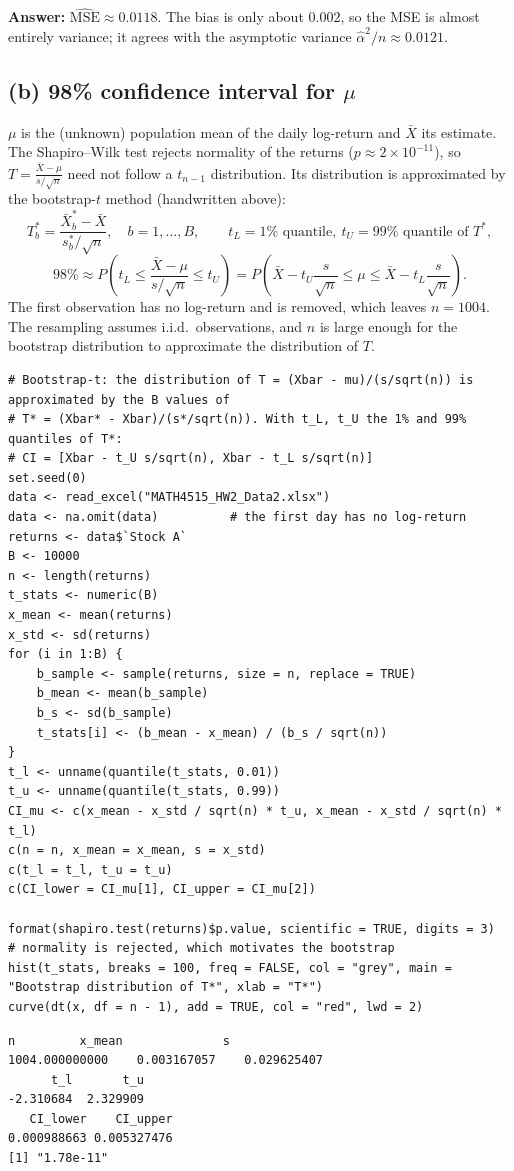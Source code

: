 \documentclass[11pt,a4paper]{article}
\begin{document}
\noindent\textbf{Answer:} $\widehat{\text{MSE}} \approx 0.0118$. The bias is only about $0.002$, so the MSE is
almost entirely variance; it agrees with the asymptotic variance $\hat\alpha^2/n \approx 0.0121$.

\subsection*{(b) 98\% confidence interval for $\mu$}

$\mu$ is the (unknown) population mean of the daily log-return and $\bar X$ its estimate. The Shapiro--Wilk test
rejects normality of the returns ($p \approx 2\times 10^{-11}$), so
$T = \frac{\bar X - \mu}{s/\sqrt n}$ need not follow a $t_{n-1}$ distribution. Its distribution is approximated by
the bootstrap-$t$ method (handwritten above):
\[
  T^*_b = \frac{\bar X^*_b - \bar X}{s^*_b/\sqrt n}, \quad b = 1,\dots,B, \qquad
  t_L = 1\%\text{ quantile}, \ t_U = 99\%\text{ quantile of } T^*,
\]
\[
  98\% \approx P\!\left(t_L \le \frac{\bar X - \mu}{s/\sqrt n} \le t_U\right)
  = P\!\left(\bar X - t_U\frac{s}{\sqrt n} \le \mu \le \bar X - t_L\frac{s}{\sqrt n}\right).
\]
The first observation has no log-return and is removed, which leaves $n = 1004$. The resampling assumes
i.i.d.\ observations, and $n$ is large enough for the bootstrap distribution to approximate the distribution of $T$.

\begin{lstlisting}
# Bootstrap-t: the distribution of T = (Xbar - mu)/(s/sqrt(n)) is approximated by the B values of
# T* = (Xbar* - Xbar)/(s*/sqrt(n)). With t_L, t_U the 1% and 99% quantiles of T*:
# CI = [Xbar - t_U s/sqrt(n), Xbar - t_L s/sqrt(n)]
set.seed(0)
data <- read_excel("MATH4515_HW2_Data2.xlsx")
data <- na.omit(data)          # the first day has no log-return
returns <- data$`Stock A`
B <- 10000
n <- length(returns)
t_stats <- numeric(B)
x_mean <- mean(returns)
x_std <- sd(returns)
for (i in 1:B) {
    b_sample <- sample(returns, size = n, replace = TRUE)
    b_mean <- mean(b_sample)
    b_s <- sd(b_sample)
    t_stats[i] <- (b_mean - x_mean) / (b_s / sqrt(n))
}
t_l <- unname(quantile(t_stats, 0.01))
t_u <- unname(quantile(t_stats, 0.99))
CI_mu <- c(x_mean - x_std / sqrt(n) * t_u, x_mean - x_std / sqrt(n) * t_l)
c(n = n, x_mean = x_mean, s = x_std)
c(t_l = t_l, t_u = t_u)
c(CI_lower = CI_mu[1], CI_upper = CI_mu[2])

format(shapiro.test(returns)$p.value, scientific = TRUE, digits = 3)  # normality is rejected, which motivates the bootstrap
hist(t_stats, breaks = 100, freq = FALSE, col = "grey", main = "Bootstrap distribution of T*", xlab = "T*")
curve(dt(x, df = n - 1), add = TRUE, col = "red", lwd = 2)
\end{lstlisting}
\begin{lstlisting}[style=rout]
             n         x_mean              s 
1004.000000000    0.003167057    0.029625407
      t_l       t_u 
-2.310684  2.329909
   CI_lower    CI_upper 
0.000988663 0.005327476
[1] "1.78e-11"
\end{lstlisting}
\end{document}
